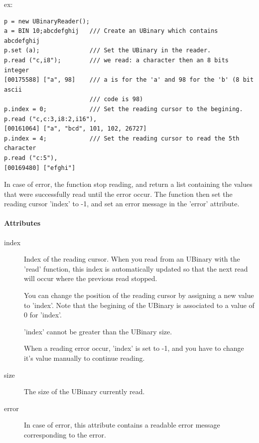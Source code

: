 \begin{description}
  ex:


\begin{lstlisting}
p = new UBinaryReader();
a = BIN 10;abcdefghij   /// Create an UBinary which contains abcdefghij
p.set (a);              /// Set the UBinary in the reader.
p.read ("c,i8");        /// we read: a character then an 8 bits integer
[00175588] ["a", 98]    /// a is for the 'a' and 98 for the 'b' (8 bit ascii
                        /// code is 98)
p.index = 0;            /// Set the reading cursor to the begining.
p.read ("c,c:3,i8:2,i16"),
[00161064] ["a", "bcd", 101, 102, 26727]
p.index = 4;            /// Set the reading cursor to read the 5th character
p.read ("c:5"),
[00169480] ["efghi"]
\end{lstlisting}

In case of error, the function stop reading, and return a list
containing the values that were successfully read until the error
occur. The function then set the reading cursor 'index' to -{}1, and
set an error message in the 'error' attribute.

\end{description}

\paragraph{Attributes}
\label{webots.uobjects.other.ubinaryreader.attributes}%

\noindent
\begin{description}
\item[index] Index of the reading cursor. When you read from an
  UBinary with the 'read' function, this index is automatically
  updated so that the next read will occur where the previous read
  stopped.


  You can change the position of the reading cursor by assigning a new
  value to 'index'. Note that the begining of the UBinary is
  associated to a value of 0 for 'index'.


  'index' cannot be greater than the UBinary size.


  When a reading error occur, 'index' is set to -{}1, and you have to
  change it's value manually to continue reading.

\item[size] The size of the UBinary currently read.

\item[error] In case of error, this attribute contains a readable
  error message corresponding to the error.
\end{description}

